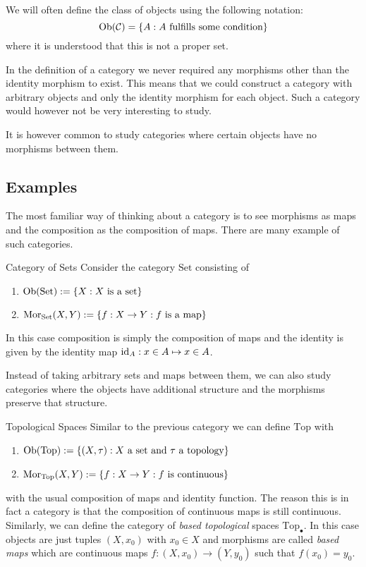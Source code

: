 \begin{notation}{}{}
We will often define the class of objects using the following notation:
\begin{equation*}
    \mathrm {Ob}(\mathcal{C}) = \{A: \text{$A$ fulfills some condition}\}
\end{equation*}
where it is understood that this is not a proper set.
\end{notation}

In the definition of a category we never required any morphisms other than the identity morphism to exist.
This means that we could construct a category with arbitrary objects and only the identity morphism for each object. 
Such a category would however not be very interesting to study.

It is however common to study categories where certain objects have no morphisms between them.

\subsection{Examples}

The most familiar way of thinking about a category is to see morphisms as maps and the composition as the composition of maps. There are many example of such categories.

\begin{example}{Category of Sets}{}
Consider the category $\mathrm{Set}$ consisting of
\begin{enumerate}
    \item $\mathrm {Ob}(\mathrm{Set}) := \{X: \text{$X$ is a set}\}$
    \item $\mathrm {Mor}_{\mathrm{Set}}(X,Y) := \{f: X \to Y: \text{$f$ is a map}\}$
\end{enumerate}
In this case composition is simply the composition of maps and the identity is given by the identity map $\mathrm{id}_A: x \in A \mapsto x \in A$.
\end{example}

Instead of taking arbitrary sets and maps between them, we can also study categories where the objects have additional structure and the morphisms preserve that structure.

\begin{example}{Topological Spaces}{}
Similar to the previous category we can define $\mathrm{Top}$ with
\begin{enumerate}
    \item $\mathrm {Ob}(\mathrm{Top}) := \{(X,\tau) : \text{$X$ a set and $\tau$ a topology}\}$
    \item $\mathrm {Mor}_{\mathrm{Top}}(X,Y) := \{f: X \to Y: \text{$f$ is continuous}\}$
\end{enumerate}
with the usual composition of maps and identity function.
The reason this is in fact a category is that the composition of continuous maps is still continuous.\\

Similarly, we can define the category of \emph{based topological} spaces $\mathrm{Top}_\bullet$. In this case objects are just tuples $(X,x_0)$ with $x_0 \in X$ and morphisms are called \emph{based maps} which are continuous maps $f: (X,x_0) \to (Y,y_0)$ such that $f(x_0) = y_0$.
\end{example}

